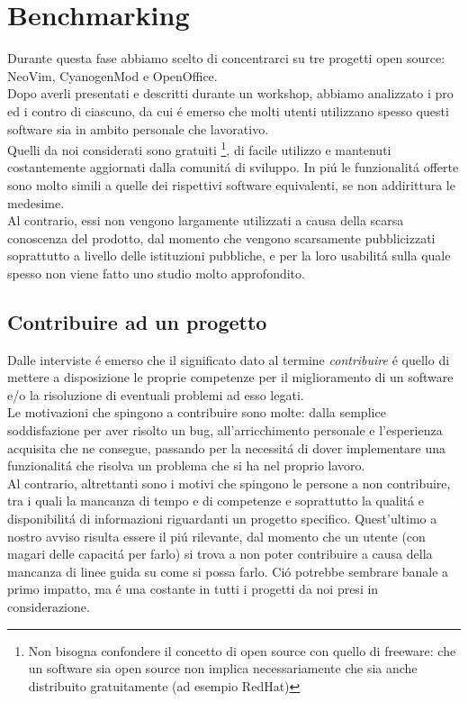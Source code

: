 \documentclass[12pt]{article} %
\begin{document}
\section{Benchmarking}
Durante questa fase abbiamo scelto di concentrarci su tre progetti open source: NeoVim, CyanogenMod e OpenOffice.\\
Dopo averli presentati e descritti durante un workshop, abbiamo analizzato i pro ed i contro di ciascuno, da cui \'e emerso che molti utenti utilizzano spesso questi software sia in ambito personale che lavorativo.\\
Quelli da noi considerati sono gratuiti \footnote{Non bisogna confondere il concetto di open source con quello di freeware: che un software sia open source non implica necessariamente che sia anche distribuito gratuitamente (ad esempio RedHat)}, di facile utilizzo e mantenuti costantemente aggiornati dalla comunit\'a di sviluppo. In pi\'u le funzionalit\'a offerte sono molto simili a quelle dei rispettivi software equivalenti, se non addirittura le medesime.\\
Al contrario, essi non vengono largamente utilizzati a causa della scarsa conoscenza del prodotto, dal momento che vengono scarsamente pubblicizzati soprattutto a livello delle istituzioni pubbliche, e per la loro usabilit\'a sulla quale spesso non viene fatto uno studio molto approfondito.\\
\subsection{Contribuire ad un progetto}
Dalle interviste \'e emerso che il significato dato al termine \emph{contribuire} \'e quello di mettere a disposizione le proprie competenze per il miglioramento di un software e/o la risoluzione di eventuali problemi ad esso legati.\\
Le motivazioni che spingono a contribuire sono molte: dalla semplice soddisfazione per aver risolto un bug, all'arricchimento personale e l'esperienza acquisita che ne consegue, passando per la necessit\'a di dover implementare una funzionalit\'a che risolva un problema che si ha nel proprio lavoro.\\
Al contrario, altrettanti sono i motivi che spingono le persone a non contribuire, tra i quali la mancanza di tempo e di competenze e soprattutto la qualit\'a e disponibilit\'a di informazioni riguardanti un progetto specifico. Quest'ultimo a nostro avviso risulta essere il pi\'u rilevante, dal momento che un utente (con magari delle capacit\'a per farlo) si trova a non poter contribuire a causa della mancanza di linee guida su come si possa farlo.		 Ci\'o potrebbe sembrare banale a primo impatto, ma \'e una costante in tutti i progetti da noi presi in considerazione.
\newpage
\end{document}
